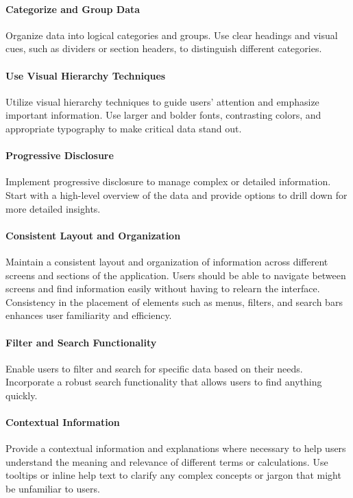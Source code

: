 \paragraph{Categorize and Group Data}
Organize data into logical categories and groups. Use clear headings and visual cues, such as dividers or 
section headers, to distinguish different categories.

\paragraph{Use Visual Hierarchy Techniques}
Utilize visual hierarchy techniques to guide users' attention and emphasize important information. Use larger and 
bolder fonts, contrasting colors, and appropriate typography to make critical data stand out.

\paragraph{Progressive Disclosure}
Implement progressive disclosure to manage complex or detailed information. Start with a high-level overview of the 
data and provide options to drill down for more detailed insights.

\paragraph{Consistent Layout and Organization}
Maintain a consistent layout and organization of information across different screens and sections of the application. 
Users should be able to navigate between screens and find information easily without having to relearn the interface. 
Consistency in the placement of elements such as menus, filters, and search bars enhances user familiarity and 
efficiency.

\paragraph{Filter and Search Functionality}
Enable users to filter and search for specific data based on their needs. Incorporate a robust search functionality 
that allows users to find anything quickly.

\paragraph{Contextual Information}
Provide a contextual information and explanations where necessary to help users understand the meaning and relevance of 
different terms or calculations. Use tooltips or inline help text to clarify any complex concepts or jargon that might 
be unfamiliar to users.

